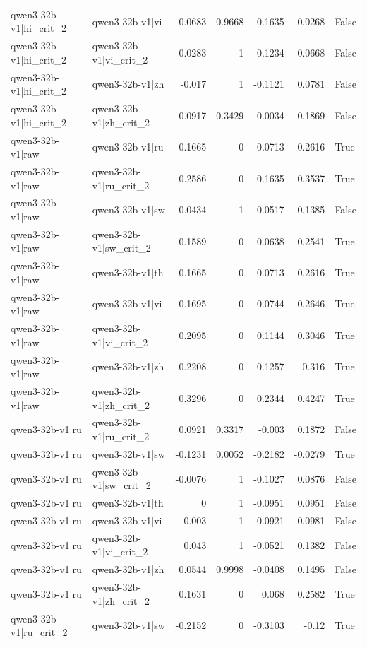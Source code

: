 \begin{table}
\begin{tabular}{l l r r r r l}
qwen3-32b-v1|hi_crit_2 & qwen3-32b-v1|vi & -0.0683 & 0.9668 & -0.1635 & 0.0268 & False \\
qwen3-32b-v1|hi_crit_2 & qwen3-32b-v1|vi_crit_2 & -0.0283 & 1 & -0.1234 & 0.0668 & False \\
qwen3-32b-v1|hi_crit_2 & qwen3-32b-v1|zh & -0.017 & 1 & -0.1121 & 0.0781 & False \\
qwen3-32b-v1|hi_crit_2 & qwen3-32b-v1|zh_crit_2 & 0.0917 & 0.3429 & -0.0034 & 0.1869 & False \\
qwen3-32b-v1|raw & qwen3-32b-v1|ru & 0.1665 & 0 & 0.0713 & 0.2616 & True \\
qwen3-32b-v1|raw & qwen3-32b-v1|ru_crit_2 & 0.2586 & 0 & 0.1635 & 0.3537 & True \\
qwen3-32b-v1|raw & qwen3-32b-v1|sw & 0.0434 & 1 & -0.0517 & 0.1385 & False \\
qwen3-32b-v1|raw & qwen3-32b-v1|sw_crit_2 & 0.1589 & 0 & 0.0638 & 0.2541 & True \\
qwen3-32b-v1|raw & qwen3-32b-v1|th & 0.1665 & 0 & 0.0713 & 0.2616 & True \\
qwen3-32b-v1|raw & qwen3-32b-v1|vi & 0.1695 & 0 & 0.0744 & 0.2646 & True \\
qwen3-32b-v1|raw & qwen3-32b-v1|vi_crit_2 & 0.2095 & 0 & 0.1144 & 0.3046 & True \\
qwen3-32b-v1|raw & qwen3-32b-v1|zh & 0.2208 & 0 & 0.1257 & 0.316 & True \\
qwen3-32b-v1|raw & qwen3-32b-v1|zh_crit_2 & 0.3296 & 0 & 0.2344 & 0.4247 & True \\
qwen3-32b-v1|ru & qwen3-32b-v1|ru_crit_2 & 0.0921 & 0.3317 & -0.003 & 0.1872 & False \\
qwen3-32b-v1|ru & qwen3-32b-v1|sw & -0.1231 & 0.0052 & -0.2182 & -0.0279 & True \\
qwen3-32b-v1|ru & qwen3-32b-v1|sw_crit_2 & -0.0076 & 1 & -0.1027 & 0.0876 & False \\
qwen3-32b-v1|ru & qwen3-32b-v1|th & 0 & 1 & -0.0951 & 0.0951 & False \\
qwen3-32b-v1|ru & qwen3-32b-v1|vi & 0.003 & 1 & -0.0921 & 0.0981 & False \\
qwen3-32b-v1|ru & qwen3-32b-v1|vi_crit_2 & 0.043 & 1 & -0.0521 & 0.1382 & False \\
qwen3-32b-v1|ru & qwen3-32b-v1|zh & 0.0544 & 0.9998 & -0.0408 & 0.1495 & False \\
qwen3-32b-v1|ru & qwen3-32b-v1|zh_crit_2 & 0.1631 & 0 & 0.068 & 0.2582 & True \\
qwen3-32b-v1|ru_crit_2 & qwen3-32b-v1|sw & -0.2152 & 0 & -0.3103 & -0.12 & True \\

\end{tabular}
\end{table}
